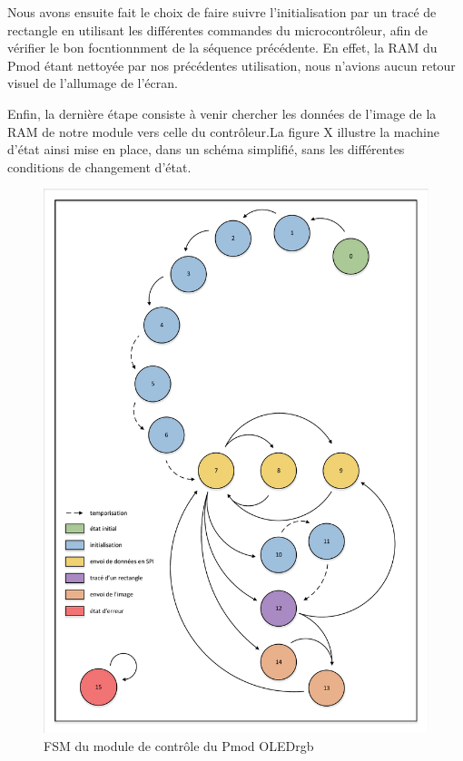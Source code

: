 \documentclass[11pt]{article}
\begin{document}
Nous avons ensuite fait le choix de faire suivre l'initialisation par un tracé de rectangle en utilisant les différentes commandes du microcontrôleur, afin de vérifier le bon focntionnment de la séquence précédente. En effet, la RAM du Pmod étant nettoyée par nos précédentes utilisation, nous n'avions aucun retour visuel de l'allumage de l'écran.

Enfin, la dernière étape consiste à venir chercher les données de l'image de la RAM de notre module vers celle du contrôleur.La figure X illustre la machine d'état ainsi mise en place, dans un schéma simplifié, sans les différentes conditions de changement d'état.

\begin{figure}[H]
\begin{center}
\includegraphics[scale = 0.67, keepaspectratio]{fsm_visio.pdf}
\caption{FSM du module de contrôle du Pmod OLEDrgb}
\end{center}
\end{figure}
\end{document}
